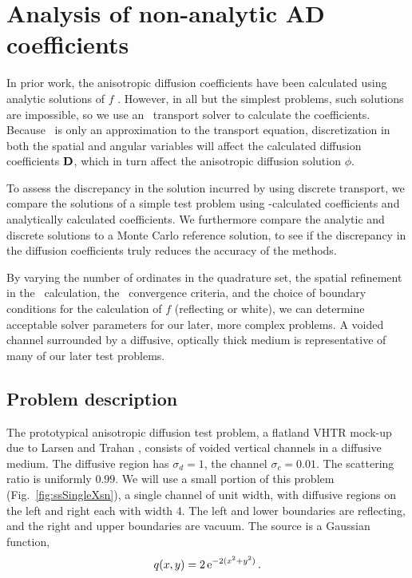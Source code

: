 \section{Analysis of non-analytic AD coefficients}

In prior work, the anisotropic diffusion coefficients have been calculated using
analytic solutions of $f$ \cite{Lar2009c}. However, in all but the simplest
problems, such solutions are impossible, so we use an \SN\ transport solver to
calculate the coefficients. Because \SN\ is only an approximation to the
transport equation, discretization in both the spatial and angular variables
will affect the calculated diffusion coefficients $\mathbf{D}$, which in turn affect
the anisotropic diffusion solution $\phi$.

To assess the discrepancy in the solution incurred by using discrete transport,
we compare the solutions of a simple test problem using \SN-calculated
coefficients and analytically calculated coefficients.  We furthermore compare
the analytic and discrete solutions to a Monte Carlo reference solution, to see
if the discrepancy in the diffusion coefficients truly reduces the accuracy of
the methods.

By varying the number of ordinates in the quadrature set, the spatial
refinement in the \SN\ calculation, the \SN\ convergence criteria, and the
choice of boundary conditions for the calculation of $f$ (reflecting or white),
we can determine acceptable solver parameters for our later, more complex
problems.  A
voided channel surrounded by a diffusive, optically thick medium is
representative of many of our later test problems.

\subsection{Problem description}

The prototypical anisotropic diffusion test problem, a flatland VHTR mock-up due
to Larsen and Trahan \cite{Lar2009c}, consists of voided vertical channels in a
diffusive medium. The diffusive region has $\sigma_d=1$, the channel
$\sigma_c=0.01$. The scattering ratio is uniformly $0.99$.  We will use a small
portion of this problem (Fig.~\ref{fig:ssSingleXsn}), a single channel of unit
width, with diffusive regions on the left and right each with width 4. The left
and lower boundaries are reflecting, and the right and upper boundaries are
vacuum. The source is a Gaussian function,
\begin{equation*}
  q(x,y) = 2 \mathop{}\!\mathrm{e}^{-2 (x^2 + y^2)}\,.
\end{equation*}

